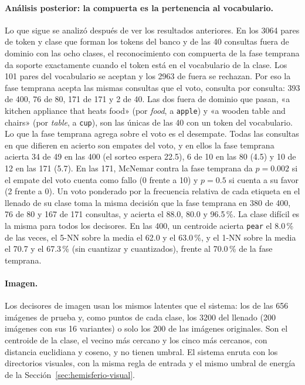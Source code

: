 \paragraph{Análisis posterior: la compuerta es la pertenencia al vocabulario.}
Lo que sigue se analizó después de ver los resultados anteriores.
En los 3064 pares de token y clase que forman los tokens del banco y de las 40 consultas
fuera de dominio con las ocho clases, el reconocimiento con compuerta de la fase
temprana da soporte exactamente cuando el token está en el vocabulario de la clase.
Los 101 pares del vocabulario se aceptan y los 2963 de fuera se rechazan.
Por eso la fase temprana acepta las mismas consultas que el voto, consulta por consulta:
393 de 400, 76 de 80, 171 de 171 y 2 de 40.
Las dos fuera de dominio que pasan, «a kitchen appliance that heats food» (por
\textit{food}, a \texttt{apple}) y «a wooden table and chairs» (por \textit{table}, a
\texttt{cup}), son las únicas de las 40 con un token del vocabulario.
Lo que la fase temprana agrega sobre el voto es el desempate.
Todas las consultas en que difieren en acierto son empates del voto, y en ellos la fase
temprana acierta 34 de 49 en las 400 (el sorteo espera 22.5), 6 de 10 en las 80 (4.5) y
10 de 12 en las 171 (5.7).
En las 171, McNemar contra la fase temprana da $p = 0.002$ si el empate del voto cuenta
como fallo (0 frente a 10) y $p = 0.5$ si cuenta a su favor (2 frente a 0).
Un voto ponderado por la frecuencia relativa de cada etiqueta en el llenado de su clase
toma la misma decisión que la fase temprana en 380 de 400, 76 de 80 y 167 de 171
consultas, y acierta el 88.0, 80.0 y 96.5\,\%.
La clase difícil es la misma para todos los decisores.
En las 400, un centroide acierta \texttt{pear} el 8.0\,\% de las veces, el 5-NN sobre la
media el 62.0 y el 63.0\,\%, y el 1-NN sobre la media el 70.7 y el 67.3\,\% (sin
cuantizar y cuantizados), frente al 70.0\,\% de la fase temprana.

\paragraph{Imagen.}
Los decisores de imagen usan los mismos latentes que el sistema: los de las 656
imágenes de prueba y, como puntos de cada clase, los 3200 del llenado (200 imágenes con
sus 16 variantes) o solo los 200 de las imágenes originales.
Son el centroide de la clase, el vecino más cercano y los cinco más cercanos, con
distancia euclidiana y coseno, y no tienen umbral.
El sistema enruta con los directorios visuales, con la misma regla de entrada y el mismo
umbral de energía de la Sección~\ref{sec:hemisferio-visual}.

